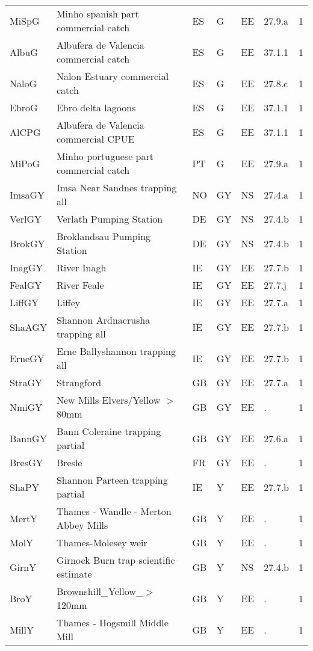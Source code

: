 \begin{table}[htbp]
\begin{tabularx}{\textwidth}{p{1.3cm}p{6.5cm}p{1cm}p{1cm}p{1cm}p{1cm}p{1.4cm}}
  MiSpG & Minho spanish part commercial catch & ES & G & EE & 27.9.a &   1 \\ 
  AlbuG & Albufera de Valencia commercial catch & ES & G & EE & 37.1.1 &   1 \\ 
  NaloG & Nalon Estuary commercial catch & ES & G & EE & 27.8.c &   1 \\ 
  EbroG & Ebro delta lagoons & ES & G & EE & 37.1.1 &   1 \\ 
  AlCPG & Albufera de Valencia commercial CPUE & ES & G & EE & 37.1.1 &   1 \\ 
  MiPoG & Minho portuguese part commercial catch & PT & G & EE & 27.9.a &   1 \\ 
  ImsaGY & Imsa Near Sandnes trapping all & NO & GY & NS & 27.4.a &   1 \\ 
  VerlGY & Verlath Pumping Station & DE & GY & NS & 27.4.b &   1 \\ 
  BrokGY & Broklandsau Pumping Station & DE & GY & NS & 27.4.b &   1 \\ 
  InagGY & River Inagh & IE & GY & EE & 27.7.b &   1 \\ 
  FealGY & River Feale & IE & GY & EE & 27.7.j &   1 \\ 
  LiffGY & Liffey & IE & GY & EE & 27.7.a &   1 \\ 
  ShaAGY & Shannon Ardnacrusha trapping all & IE & GY & EE & 27.7.b &   1 \\ 
  ErneGY & Erne Ballyshannon trapping all & IE & GY & EE & 27.7.b &   1 \\ 
  StraGY & Strangford & GB & GY & EE & 27.7.a &   1 \\ 
  NmiGY & New Mills Elvers/Yellow $>$80mm & GB & GY & EE & . &   1 \\ 
  BannGY & Bann Coleraine trapping partial & GB & GY & EE & 27.6.a &   1 \\ 
  BresGY & Bresle & FR & GY & EE & . &   1 \\ 
  ShaPY & Shannon Parteen trapping partial & IE & Y & EE & 27.7.b &   1 \\ 
  MertY & Thames - Wandle - Merton Abbey Mills & GB & Y & EE & . &   1 \\ 
  MolY & Thames-Molesey weir & GB & Y & EE & . &   1 \\ 
  GirnY & Girnock Burn trap scientific estimate & GB & Y & NS & 27.4.b &   1 \\ 
  BroY & Brownshill\_Yellow\_$>$120mm & GB & Y & EE & . &   1 \\ 
  MillY & Thames - Hogsmill  Middle Mill & GB & Y & EE & . &   1 \\ 
   \hline
\end{tabularx}
\end{table}
